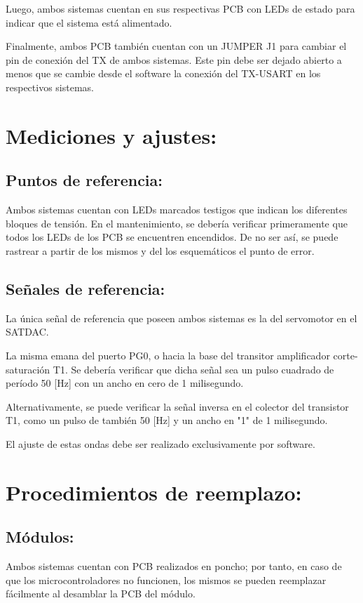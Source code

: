 \documentclass[conference]{IEEEtran}
\begin{document}
Luego, ambos sistemas cuentan en sus respectivas PCB con LEDs de estado para indicar que el sistema está alimentado.

Finalmente, ambos PCB también cuentan con un JUMPER J1 para cambiar el pin de conexión del TX de ambos sistemas. Este pin debe ser dejado abierto a menos que se cambie desde el software la conexión del TX-USART en los respectivos sistemas.
\section{Mediciones y ajustes:}
\label{sec:orgd5a399b}
\subsection{Puntos de referencia:}
\label{sec:org0bfd5c2}
Ambos sistemas cuentan con LEDs marcados testigos que indican los diferentes bloques de tensión. En el mantenimiento, se debería verificar primeramente que todos los LEDs de los PCB se encuentren encendidos. De no ser así, se puede rastrear a partir de los mismos y del los esquemáticos el punto de error.
\subsection{Señales de referencia:}
\label{sec:orga26c996}
La única señal de referencia que poseen ambos sistemas es la del servomotor en el SATDAC.

La misma emana del puerto PG0, o hacia la base del transitor amplificador corte-saturación T1. Se debería verificar que dicha señal sea un pulso cuadrado de período 50 [Hz] con un ancho en cero de 1 milisegundo.

Alternativamente, se puede verificar la señal inversa en el colector del transistor T1, como un pulso de también 50 [Hz] y un ancho en "1" de 1 milisegundo.

El ajuste de estas ondas debe ser realizado exclusivamente por software.
\section{Procedimientos de reemplazo:}
\label{sec:org224fde4}
\subsection{Módulos:}
\label{sec:orgf8061fa}
Ambos sistemas cuentan con PCB realizados en poncho; por tanto, en caso de que los microcontroladores no funcionen, los mismos se pueden reemplazar fácilmente al desamblar la PCB del módulo.
\end{document}
